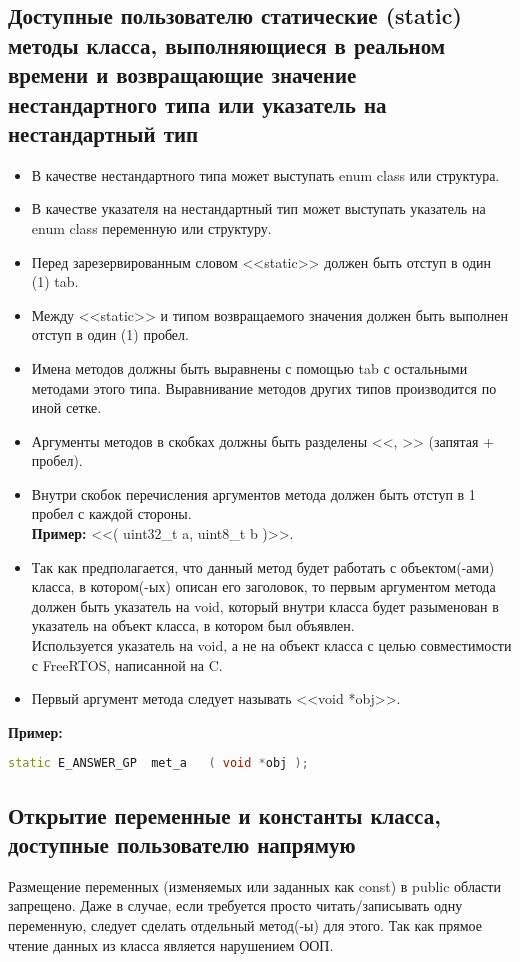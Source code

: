 \subsection{Доступные пользователю статические (static) методы класса, выполняющиеся в реальном времени и возвращающие значение нестандартного типа или указатель на нестандартный тип}\label{dp:s:n}
\begin{itemize}
	\item В качестве нестандартного типа может выступать enum class или структура.
	\item В качестве указателя на нестандартный тип может выступать указатель на enum class переменную или структуру.
	\item Перед зарезервированным словом <<static>> должен быть отступ в один (1) tab.
	\item Между <<static>> и типом возвращаемого значения должен быть выполнен отступ в один (1) пробел.
	\item Имена методов должны быть выравнены с помощью tab с остальными методами этого типа. Выравнивание методов других типов производится по иной сетке.
	\item Аргументы методов в скобках должны быть разделены <<, >> (запятая + пробел).
	\item Внутри скобок перечисления аргументов метода должен быть отступ в 1 пробел с каждой стороны.\\\textbf{Пример: } <<( uint32\_t a, uint8\_t b )>>.
	\item Так как предполагается, что данный метод будет работать с объектом(-ами) класса, в котором(-ых) описан его заголовок, то первым аргументом метода должен быть указатель на void, который внутри класса будет разыменован в указатель на объект класса, в котором был объявлен.\\Используется указатель на void, а не на объект класса с целью совместимости с FreeRTOS, написанной на C.
	\item Первый аргумент метода следует называть <<void *obj>>.
\end{itemize}
\textbf{Пример:}\begin{lstlisting}[language=C++, frame=tlBR, basicstyle=\fontsize{10}{10}\ttfamily]
	static E_ANSWER_GP	met_a	( void *obj );
\end{lstlisting}

\subsection{Открытие переменные и константы класса, доступные пользователю напрямую}\label{dp:op}
Размещение переменных (изменяемых или заданных как const) в public области запрещено. Даже в случае, если требуется просто читать/записывать одну переменную, следует сделать отдельный метод(-ы) для этого. Так как прямое чтение данных из класса является нарушением ООП.

